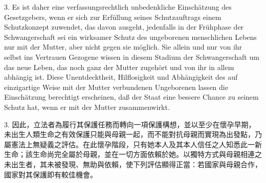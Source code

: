 \documentclass[12pt]{article}
\begin{document}
\begin{sourcepara}[title={原文D.75}]
3. Es ist daher eine verfassungsrechtlich unbedenkliche Einschätzung des Gesetzgebers, wenn er sich zur Erfüllung seines Schutzauftrags einem Schutzkonzept zuwendet, das davon ausgeht, jedenfalls in der Frühphase der Schwangerschaft sei ein wirksamer Schutz des ungeborenen menschlichen Lebens nur mit der Mutter, aber nicht gegen sie möglich. Sie allein und nur von ihr selbst ins Vertrauen Gezogene wissen in diesem Stadium der Schwangerschaft um das neue Leben, das noch ganz der Mutter zugehört und von ihr in allem abhängig ist. Diese Unentdecktheit, Hilflosigkeit und Abhängigkeit des auf einzigartige Weise mit der Mutter verbundenen Ungeborenen lassen die Einschätzung berechtigt erscheinen, daß der Staat eine bessere Chance zu seinem Schutz hat, wenn er mit der Mutter zusammenwirkt.
\end{sourcepara}
\begin{transpara}
3. 因此，立法者為履行其保護任務而轉向一項保護構想，並以至少在懷孕早期，未出生人類生命之有效保護只能與母親一起，而不能對抗母親而實現為出發點，乃屬憲法上無疑義之評估。在此懷孕階段，只有她本人及其本人信任之人知悉此一新生命；該生命尚完全屬於母親，並在一切方面依賴於她。以獨特方式與母親相連之未出生者，其未被發現、無助與依賴，使下列評估顯得正當：若國家與母親合作，國家對其保護即有較佳機會。
\end{transpara}
\end{document}
